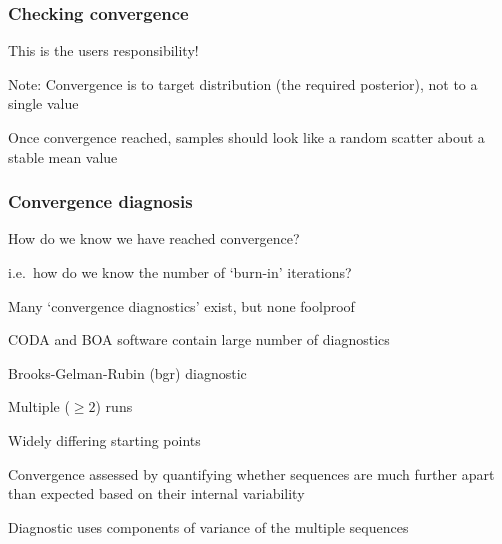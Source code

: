 \begin{frame}[t]
\frametitle{Checking convergence}

This is the users responsibility!\vspace{2mm}

\bibig
\item Note: Convergence is to target \alert{distribution}
  (the required posterior), not to a single value\vspace{2mm}
\item Once convergence reached, samples should look like
  a random scatter about a stable mean value
\eibig

\end{frame}


\begin{frame}

\frametitle{Convergence diagnosis}

\bibig
\item How do we know we have reached convergence?\vspace{1mm}
    \bi
    \item i.e.~how do we know the number of \lq burn-in' iterations?\vspace{2mm}
    \ei
\item Many \lq convergence diagnostics' exist, but none foolproof\vspace{2mm}
\item CODA and BOA software contain large number of diagnostics\vspace{3mm}
\eibig

\alert{Brooks-Gelman-Rubin (bgr) diagnostic}\vspace{1mm}

\bibig
\item Multiple ($\ge 2$) runs\vspace{1mm}
\item Widely differing starting points\vspace{1mm}
\item Convergence assessed by quantifying whether sequences are much
further apart than expected based on their internal variability\vspace{1mm}
\item Diagnostic uses components of variance of the multiple sequences
\eibig

\end{frame}


